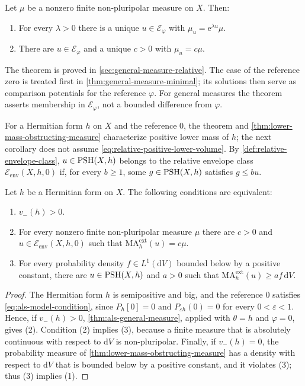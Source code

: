\begin{theorem}
\label{thm:als-general-measure}
Let $\mu$ be a nonzero finite non-pluripolar measure on $X$. Then:
\begin{enumerate}
\item For every $\lambda>0$ there is a unique
$u\in\mathcal E_\varphi$ with $\mu_u=\mathrm{e}^{\lambda u}\mu$.
\item There are $u\in\mathcal E_\varphi$ and a unique $c>0$ with $\mu_u=c\mu$.
\end{enumerate}
\end{theorem}

The theorem is proved in \cref{sec:general-measure-relative}. The case of the reference zero is treated first in \cref{thm:general-measure-minimal}; its solutions then serve as comparison potentials for the reference $\varphi$. For general measures the theorem asserts membership in $\mathcal E_\varphi$, not a bounded difference from $\varphi$.

For a Hermitian form $h$ on $X$ and the reference $0$, the theorem and \cref{thm:lower-mass-obstructing-measure} characterize positive lower mass of $h$; the next corollary does not assume \eqref{eq:relative-positive-lower-volume}. By \cref{def:relative-envelope-class}, $u\in\mathrm{PSH}(X,h)$ belongs to the relative envelope class $\mathcal E_{\mathrm{env}}(X,h,0)$ if, for every $b\geq1$, some $g\in\mathrm{PSH}(X,h)$ satisfies $g\leq bu$.

\begin{corollary}\label{cor:positive-lower-mass-solvability}
Let $h$ be a Hermitian form on $X$. The following conditions are equivalent:
\begin{enumerate}
\item $v_-(h)>0$.
\item For every nonzero finite non-pluripolar measure $\mu$ there are $c>0$ and $u\in\mathcal E_{\mathrm{env}}(X,h,0)$ such that
$\mathrm{MA}^{\mathrm{ext}}_h(u)=c\mu$.
\item For every probability density $f\in L^1(\mathrm{d}V)$ bounded below by a positive constant, there are $u\in\mathrm{PSH}(X,h)$ and $a>0$ such that
$\mathrm{MA}^{\mathrm{ext}}_h(u)\geq af\,\mathrm{d}V$.
\end{enumerate}
\end{corollary}
\begin{proof}
The Hermitian form $h$ is semipositive and big, and the reference $0$ satisfies \eqref{eq:als-model-condition}, since $P_h[0]=0$ and $P_{\varepsilon h}(0)=0$ for every $0<\varepsilon<1$. Hence, if $v_-(h)>0$, \cref{thm:als-general-measure}, applied with $\theta=h$ and $\varphi=0$, gives (2). Condition (2) implies (3), because a finite measure that is absolutely continuous with respect to $\mathrm{d}V$ is non-pluripolar. Finally, if $v_-(h)=0$, the probability measure of \cref{thm:lower-mass-obstructing-measure} has a density with respect to $\mathrm{d}V$ that is bounded below by a positive constant, and it violates (3); thus (3) implies (1).
\end{proof}

